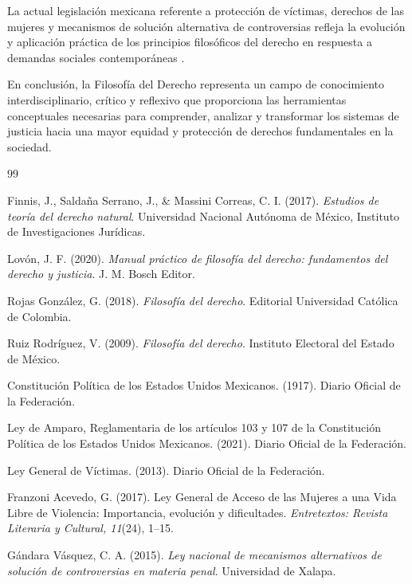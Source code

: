 \documentclass[
	spanish, %
	letterpaper, oneside
]{article}
\begin{document}
La actual legislación mexicana referente a protección de víctimas, derechos de las mujeres y mecanismos de solución alternativa de controversias refleja la evolución y aplicación práctica de los principios filosóficos del derecho en respuesta a demandas sociales contemporáneas \cite{de_victimas_ley_2013,franzoni_acevedo_ley_2017,gandara_ley_2015}.

En conclusión, la Filosofía del Derecho representa un campo de conocimiento interdisciplinario, crítico y reflexivo que proporciona las herramientas conceptuales necesarias para comprender, analizar y transformar los sistemas de justicia hacia una mayor equidad y protección de derechos fundamentales en la sociedad.

\clearpage

% 

\begin{thebibliography}{99}


Finnis, J., Saldaña Serrano, J., \& Massini Correas, C. I. (2017). \textit{Estudios de teoría del derecho natural}. Universidad Nacional Autónoma de México, Instituto de Investigaciones Jurídicas.

Lovón, J. F. (2020). \textit{Manual práctico de filosofía del derecho: fundamentos del derecho y justicia}. J. M. Bosch Editor.

Rojas González, G. (2018). \textit{Filosofía del derecho}. Editorial Universidad Católica de Colombia.

Ruiz Rodríguez, V. (2009). \textit{Filosofía del derecho}. Instituto Electoral del Estado de México.

Constitución Política de los Estados Unidos Mexicanos. (1917). Diario Oficial de la Federación.

Ley de Amparo, Reglamentaria de los artículos 103 y 107 de la Constitución Política de los Estados Unidos Mexicanos. (2021). Diario Oficial de la Federación.

Ley General de Víctimas. (2013). Diario Oficial de la Federación.

Franzoni Acevedo, G. (2017). Ley General de Acceso de las Mujeres a una Vida Libre de Violencia: Importancia, evolución y dificultades. \textit{Entretextos: Revista Literaria y Cultural, 11}(24), 1--15.

Gándara Vásquez, C. A. (2015). \textit{Ley nacional de mecanismos alternativos de solución de controversias en materia penal}. Universidad de Xalapa.

\end{thebibliography}

\end{document}
